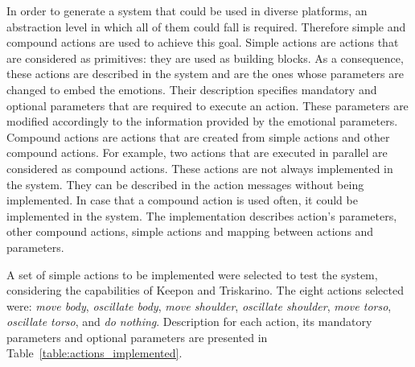 In order to generate a system that could be used in diverse platforms, an abstraction level in which all of them could fall is required. Therefore simple and compound actions are used to achieve this goal. Simple actions are actions that are considered as primitives: they are used as building blocks. As a consequence, these actions are described in the system and are the ones whose parameters are changed to embed the emotions. Their description specifies mandatory and optional parameters that are required to execute an action. These parameters are modified accordingly to the information provided by the emotional parameters. Compound actions are actions that are created from simple actions and other compound actions. For example, two actions that are executed in parallel are considered as compound actions. These actions are not always implemented in the system. They can be described in the action messages without being implemented. In case that a compound action is used often, it could be implemented in the system. The implementation describes action's parameters, other compound actions, simple actions and mapping between actions and parameters.

A set of simple actions to be implemented were selected to test the system, considering the capabilities of Keepon and Triskarino. The eight actions selected were: \textit{move body}, \textit{oscillate body}, \textit{move shoulder}, \textit{oscillate shoulder}, \textit{move torso}, \textit{oscillate torso}, and \textit{do nothing}. Description for each action, its mandatory parameters and optional parameters are presented in Table~\ref{table:actions_implemented}.

